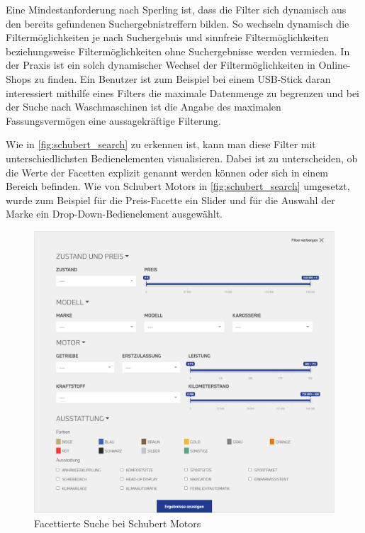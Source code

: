 Eine Mindestanforderung nach Sperling \cite{Martin.2018} ist, dass die Filter sich dynamisch aus den bereits gefundenen Suchergebnistreffern bilden. So wechseln dynamisch die Filtermöglichkeiten je nach Suchergebnis und sinnfreie Filtermöglichkeiten beziehungsweise Filtermöglichkeiten ohne Suchergebnisse werden vermieden. In der Praxis ist ein solch dynamischer Wechsel der Filtermöglichkeiten in Online-Shops zu finden. Ein Benutzer ist zum Beispiel bei einem USB-Stick daran interessiert mithilfe eines Filters die maximale Datenmenge zu begrenzen und bei der Suche nach Waschmaschinen ist die Angabe des maximalen Fassungsvermögen eine aussagekräftige Filterung.

Wie in \autoref{fig:schubert_search} zu erkennen ist, kann man diese Filter mit unterschiedlichsten Bedienelementen visualisieren. Dabei ist zu unterscheiden, ob die Werte der Facetten explizit genannt werden können oder sich in einem Bereich befinden. Wie von Schubert Motors \cite{SchubertMotorsGmbH.2021} in \autoref{fig:schubert_search} umgesetzt, wurde zum Beispiel für die Preis-Facette ein Slider und für die Auswahl der Marke ein Drop-Down-Bedienelement ausgewählt.

\begin{figure}[H]
    \centering
    \includegraphics[width=0.85\linewidth]{images/schubert_search.png}
    \caption{Facettierte Suche bei Schubert Motors \cite{SchubertMotorsGmbH.2021}}
    \label{fig:schubert_search}
\end{figure}

